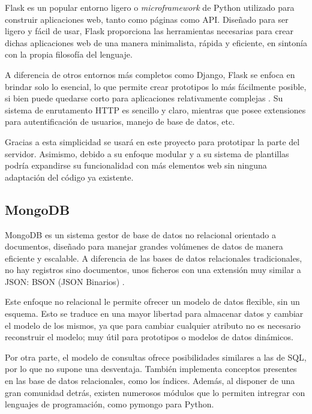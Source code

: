             Flask es un popular entorno ligero o \textit{microframework} de Python utilizado para construir aplicaciones 
            web, tanto como páginas como API. Diseñado para ser ligero y fácil de usar, Flask proporciona las herramientas 
            necesarias para crear dichas aplicaciones web de una manera minimalista, rápida y eficiente, en sintonía con 
            la propia filosofía del lenguaje. 

            A diferencia de otros entornos más completos como Django, Flask se enfoca en brindar solo lo esencial, lo que 
            permite crear prototipos lo más fácilmente posible, si bien puede quedarse corto para aplicaciones 
            relativamente complejas \cite{rodriguez_flask_2014}. Su sistema de enrutamento HTTP es sencillo y claro, mientras que posee extensiones 
            para autentificación de usuarios, manejo de base de datos, etc. 

            Gracias a esta simplicidad se usará en este proyecto para prototipar la parte del servidor. Asimismo, debido a 
            su enfoque modular y a su sistema de plantillas podría expandirse su funcionalidad con más elementos web sin 
            ninguna adaptación del código ya existente.


        \subsection{MongoDB}
            MongoDB es un sistema gestor de base de datos no relacional orientado a documentos, diseñado para manejar 
            grandes volúmenes de datos de manera eficiente y escalable. A diferencia de las bases de datos relacionales 
            tradicionales, no hay registros sino documentos, unos ficheros con una extensión muy similar a JSON: BSON 
            (JSON Binarios) \cite{noauthor_json_nodate}. 

            Este enfoque no relacional le permite ofrecer un modelo de datos flexible, sin un esquema. Esto se traduce
            en una mayor libertad para almacenar datos y cambiar el modelo de los mismos, ya que para cambiar cualquier
            atributo no es necesario reconstruir el modelo; muy útil para prototipos o modelos de datos dinámicos.
            

            Por otra parte, el modelo de consultas ofrece posibilidades similares a las de SQL, por lo que no supone
            una desventaja. También implementa conceptos presentes en las base de datos relacionales, como los índices. 
            Además, al disponer de una gran comunidad detrás, existen numerosos módulos que lo permiten
            intregrar con lenguajes de programación, como pymongo para Python. 

